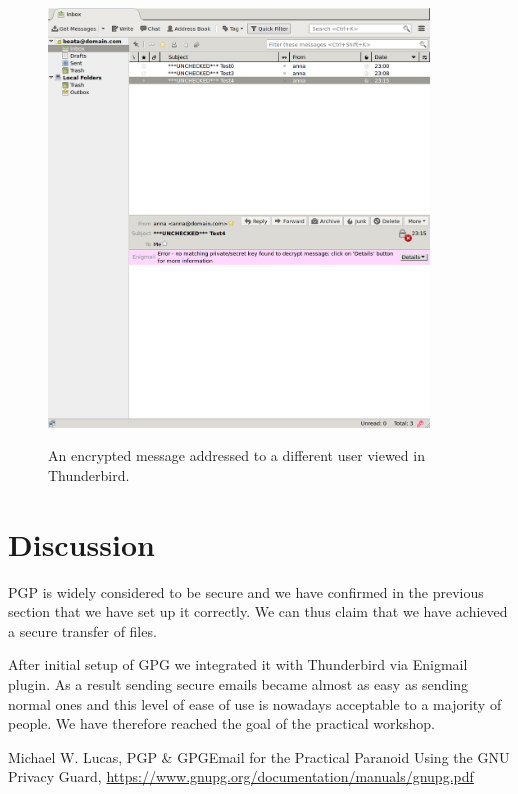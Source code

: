 \documentclass{classrep}
\begin{document}
\begin{figure}[H]
\centering
    \includegraphics[width=0.9\textwidth]{images/confidentiality-fail.png}
    \label{fig:confidentiality-fail}
    \caption{An encrypted message addressed to a different user viewed in Thunderbird.}
\end{figure}

\section{Discussion}

PGP is widely considered to be secure and we have confirmed in the previous section that
we have set up it correctly. We can thus claim that we have achieved a secure transfer
of files.

After initial setup of GPG we integrated it with Thunderbird via Enigmail plugin. As
a result sending secure emails became almost as easy as sending normal ones and
this level of ease of use is nowadays acceptable to a majority of people. We have
therefore reached the goal of the practical workshop.

\begin{thebibliography}{0}
     Michael W. Lucas, PGP \& GPGEmail for the Practical Paranoid
     Using the GNU Privacy Guard, \url{https://www.gnupg.org/documentation/manuals/gnupg.pdf}
\end{thebibliography}
\end{document}
